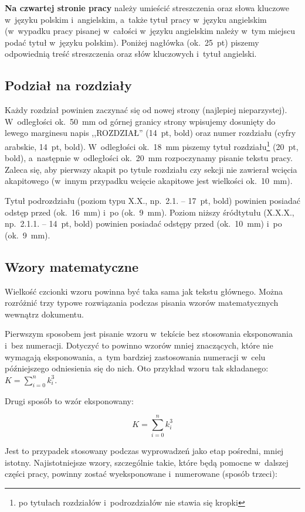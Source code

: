 \documentclass[skorowidz,skroty]{dyplomWEZUT}
\begin{document}
\textbf{Na czwartej stronie pracy} należy umieścić streszczenia oraz słowa kluczowe w~języku polskim i~angielskim, a~także tytuł pracy w~języku angielskim (w~wypadku pracy pisanej w~całości w~języku angielskim należy w~tym miejscu podać tytuł w~języku polskim). Poniżej nagłówka (ok.~25~pt) piszemy odpowiednią treść streszczenia oraz słów kluczowych i~tytuł angielski.

\subsection{Podział na rozdziały}

Każdy rozdział powinien zaczynać się od nowej strony (najlepiej nieparzystej). W~odległości ok.~50~mm od górnej granicy strony wpisujemy dosunięty do lewego marginesu napis ,,ROZDZIAŁ'' (14~pt, bold) oraz numer rozdziału (cyfry arabskie, 14~pt, bold). W~odległości ok.~18~mm piszemy tytuł rozdziału\footnote{po tytułach rozdziałów i~podrozdziałów nie stawia się kropki} (20~pt, bold), a~następnie w~odległości ok.~20~mm rozpoczynamy pisanie tekstu pracy. Zaleca się, aby pierwszy akapit po tytule rozdziału czy sekcji nie zawierał wcięcia akapitowego (w~innym przypadku wcięcie akapitowe jest wielkości ok.~10~mm).

Tytuł podrozdziału (poziom typu X.X., np.~2.1. -- 17~pt, bold) powinien posiadać odstęp przed (ok.~16~mm) i~po (ok.~9~mm). Poziom niższy śródtytułu (X.X.X., np.~2.1.1. -- 14~pt, bold) powinien posiadać odstępy przed (ok.~10~mm) i~po (ok.~9~mm).

\subsection{Wzory matematyczne}\label{subsec:equations}

Wielkość czcionki wzoru powinna być taka sama jak tekstu głównego. Można rozróżnić trzy typowe rozwiązania podczas pisania wzorów matematycznych wewnątrz dokumentu.

Pierwszym sposobem jest pisanie wzoru w~tekście bez stosowania eksponowania i~bez numeracji. Dotyczyć to powinno wzorów mniej znaczących, które nie wymagają eksponowania, a~tym bardziej zastosowania numeracji w~celu późniejszego odniesienia się do nich. Oto przykład wzoru tak składanego: $K=\sum_{i=0}^n k_{i}^{3}$.

Drugi sposób to wzór eksponowany:

$$K=\sum_{i=0}^n k_{i}^{3}$$

Jest to przypadek stosowany podczas wyprowadzeń jako etap pośredni, mniej istotny. Najistotniejsze wzory, szczególnie takie, które będą pomocne w~dalszej części pracy, powinny zostać wyeksponowane i~numerowane (sposób trzeci):
\end{document}
